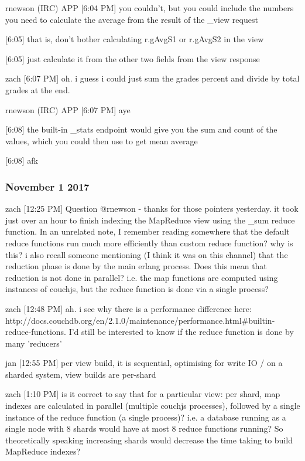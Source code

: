 rnewson (IRC) APP [6:04 PM]
you couldn't, but you could include the numbers you need to calculate the average from the result of the \_view request

    [6:05]
that is, don't bother calculating r.gAvgS1 or r.gAvgS2 in the view

    [6:05]
just calculate it from the other two fields from the view response

zach [6:07 PM]
oh. i guess i could just sum the grades percent and divide by total grades at the end.

rnewson (IRC) APP [6:07 PM]
aye

    [6:08]
the built-in \_stats endpoint would give you the sum and count of the values, which you could then use to get mean average

    [6:08]
afk

\subsubsection{November 1 2017}
\label{slack-1-nov}
zach [12:25 PM]
Question @rnewson - thanks for those pointers yesterday. it took just over an hour to finish indexing the MapReduce view using the \_sum reduce function. In an unrelated note, I remember reading somewhere that the default reduce functions run much more efficiently than custom reduce function? why is this? i also recall someone mentioning (I think it was on this channel) that the reduction phase is done by the main erlang process. Does this mean that reduction is not done in parallel? i.e. the map functions are computed using instances of couchjs, but the reduce function is done via a single process?

zach [12:48 PM]
ah. i see why there is a performance difference here: http://docs.couchdb.org/en/2.1.0/maintenance/performance.html\#builtin-reduce-functions. I'd still be interested to know if the reduce function is done by many 'reducers'

jan [12:55 PM]
per view build, it is sequential, optimising for write IO / on a sharded system, view builds are per-shard

zach [1:10 PM]
is it correct to say that for a particular view: per shard, map indexes are calculated in parallel (multiple couchjs processes), followed by a single instance of the reduce function (a single process)? i.e. a database running as a single node with 8 shards would have at most 8 reduce functions running? So theoretically speaking increasing shards would decrease the time taking to build MapReduce indexes?

